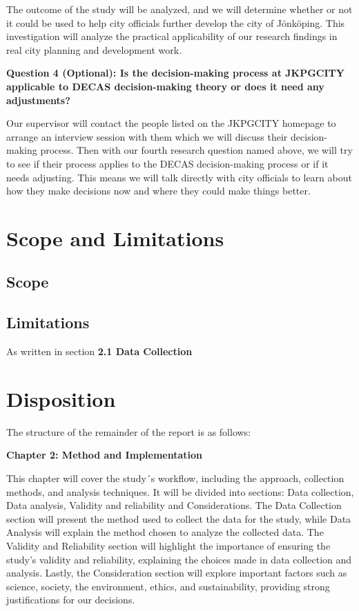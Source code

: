 The outcome of the study will be analyzed, and we will determine whether or not it could be used to help city officials further develop the city of Jönköping. This investigation will analyze the practical applicability of our research findings in real city planning and development work.



\textbf{Question 4 (Optional): Is the decision-making process at JKPGCITY applicable to DECAS decision-making theory or does it need any adjustments?  }


Our supervisor will contact the people listed on the JKPGCITY homepage to arrange an interview session with them which we will discuss their decision-making process. Then with our fourth research question named above, we will try to see if their process applies to the DECAS decision-making process or if it needs adjusting. This means we will talk directly with city officials to learn about how they make decisions now and where they could make things better.




\section{Scope and Limitations}

\subsection{Scope}

\subsection{Limitations}
As written in section \textbf{2.1 Data Collection}


\section{Disposition}
The structure of the remainder of the report is as follows: 

\textbf{Chapter 2: Method and Implementation}

This chapter will cover the study´s workflow, including the approach, collection methods, and analysis techniques. It will be divided into sections: Data collection, Data analysis, Validity and reliability and Considerations. The Data Collection section will present the method used to collect the data for the study, while Data Analysis will explain the method chosen to analyze the collected data. The Validity and Reliability section will highlight the importance of ensuring the study’s validity and reliability, explaining the choices made in data collection and analysis. Lastly, the Consideration section will explore important factors such as science, society, the environment, ethics, and sustainability, providing strong justifications for our decisions.




